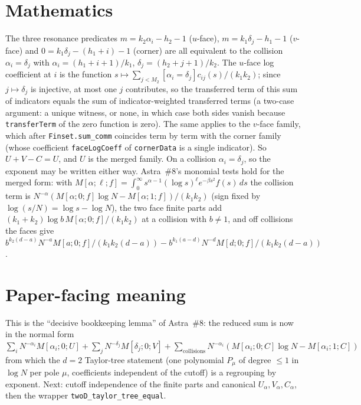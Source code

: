 \documentclass[11pt]{article}
\begin{document}
\section{Mathematics}

The three resonance predicates $m=k_2\alpha_i-h_2-1$ ($u$-face), $m=k_1\delta_j-h_1-1$ ($v$-face)
and $0=k_1\delta_j-(h_1+i)-1$ (corner) are all equivalent to the collision $\alpha_i=\delta_j$
with $\alpha_i=(h_1+i+1)/k_1$, $\delta_j=(h_2+j+1)/k_2$. The $u$-face log coefficient at $i$ is the
function $s\mapsto\sum_{j<M_2}[\alpha_i=\delta_j]c_{ij}(s)/(k_1k_2)$; since $j\mapsto\delta_j$ is
injective, at most one $j$ contributes, so the transferred term of this sum of indicators equals the
sum of indicator-weighted transferred terms (a two-case argument: a unique witness, or none, in which
case both sides vanish because \texttt{transferTerm} of the zero function is zero). The same applies
to the $v$-face family, which after \texttt{Finset.sum\_comm} coincides term by term with the corner
family (whose coefficient \texttt{faceLogCoeff} of \texttt{cornerData} is a single indicator). So
$U+V-C=U$, and $U$ is the merged family. On a collision $\alpha_i=\delta_j$, so the exponent may be
written either way. Astra~\#8's monomial tests hold for the merged form: with
$M[\alpha;\ell;f]=\int_0^\infty s^{\alpha-1}(\log s)^\ell e^{-\beta s^2}f(s)\,ds$ the collision term is
$N^{-\alpha}(M[\alpha;0;f]\log N-M[\alpha;1;f])/(k_1k_2)$ (sign fixed by
$\log(s/N)=\log s-\log N$), the two face finite parts add $(k_1+k_2)\log b\,M[\alpha;0;f]/(k_1k_2)$
at a collision with $b\ne1$, and off collisions the faces give
$b^{k_2(d-a)}N^{-a}M[a;0;f]/(k_1k_2(d-a))-b^{k_1(a-d)}N^{-d}M[d;0;f]/(k_1k_2(d-a))$.

\section{Paper-facing meaning}

This is the ``decisive bookkeeping lemma'' of Astra~\#8: the reduced sum is now in the normal form
$\sum_iN^{-\alpha_i}M[\alpha_i;0;U]+\sum_jN^{-\delta_j}M[\delta_j;0;V]+\sum_{\text{collisions}}N^{-\alpha_i}(M[\alpha_i;0;C]\log N-M[\alpha_i;1;C])$
from which the $d=2$ Taylor-tree statement (one polynomial $P_\mu$ of degree $\le1$ in $\log N$ per
pole $\mu$, coefficients independent of the cutoff) is a regrouping by exponent. Next: cutoff
independence of the finite parts and canonical $U_\alpha,V_\alpha,C_\alpha$, then the wrapper
\texttt{twoD\_taylor\_tree\_equal}.
\end{document}
